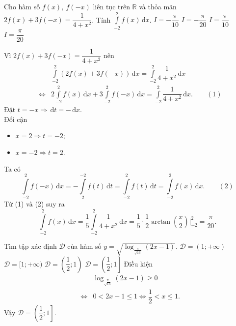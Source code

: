 \begin{ex}%
	Cho hàm số $f(x),~f(-x)$ liên tục trên $\mathbb{R}$ và thỏa mãn $2f(x)+3f(-x)=\dfrac{1}{4+x^2}$. Tính $\displaystyle\int\limits_{-2}^2 f(x)\mathrm{\,d}x$.
	\choice
	{$I=-\dfrac{\pi}{10}$}
	{$I=-\dfrac{\pi}{20}$}
	{$I=\dfrac{\pi}{10}$}
	{\True $I=\dfrac{\pi}{20}$}
	\loigiai
	{
		Vì  $2f(x)+3f(-x)=\dfrac{1}{4+x^2}$ nên
		\begin{eqnarray*}
			& & \displaystyle\int\limits_{-2}^2 \left(2f(x)+3f(-x)\right)\mathrm{\,d}x=\displaystyle\int\limits_{-2}^2 \dfrac{1}{4+x^2}\mathrm{\,d}x\\
			& \Leftrightarrow & \displaystyle2\int\limits_{-2}^2 f(x)\mathrm{\,d}x+\displaystyle3\int\limits_{-2}^2 f(-x)\mathrm{\,d}x=\displaystyle\int\limits_{-2}^2 \dfrac{1}{4+x^2}\mathrm{\,d}x.\qquad(1)
		\end{eqnarray*}
		Đặt $t=-x \Rightarrow \mathrm{\,d}t=-\mathrm{\,d}x$.\\
		Đổi cận 
		\begin{itemize}
			\item $x=2\Rightarrow t=-2$;
			\item $x=-2 \Rightarrow t=2$.
		\end{itemize}
		Ta có \[\displaystyle\int\limits_{-2}^2 f(-x)\mathrm{\,d}x=\displaystyle-\int\limits_2^{-2} f(t)\mathrm{\,d}t=\displaystyle\int\limits_{-2}^2 f(t)\mathrm{\,d}t=\displaystyle\int\limits_{-2}^2 f(x)\mathrm{\,d}x.\qquad(2)\]
		Từ (1) và (2) suy ra \[\displaystyle\int\limits_{-2}^2 f(x)\mathrm{\,d}x=\dfrac{1}{5}\displaystyle\int\limits_{-2}^2 \dfrac{1}{4+x^2}\mathrm{\,d}x=\dfrac{1}{5}\cdot\dfrac{1}{2}\arctan \left(\dfrac{x}{2}\right) \bigg|_{-2}^{2}=\dfrac{\pi}{20}.\]
		 
	}
\end{ex}

\begin{ex}%
	Tìm tập xác định $\mathscr{D}$ của hàm số $y=\sqrt{\log_{\tfrac{\pi}{\sqrt{13}}} (2x-1)}$.
	\choice
	{$\mathscr{D}=(1;+\infty)$}
	{$\mathscr{D}=[1;+\infty)$}
	{$\mathscr{D}=\left(\dfrac{1}{2};1\right)$}
	{\True $\mathscr{D}=\left(\dfrac{1}{2};1\right]$}
	\loigiai
	{
		Điều kiện 
		\begin{eqnarray*}
			& & \log_{\tfrac{\pi}{\sqrt{13}}} (2x-1)\ge0 \\
			& \Leftrightarrow & 0<2x-1\le1 \Leftrightarrow \dfrac{1}{2}< x\le 1.
		\end{eqnarray*}
		Vậy $\mathscr{D}=\left(\dfrac{1}{2};1\right]$.
	}
\end{ex}

